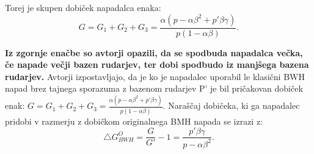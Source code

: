 \documentclass{acm_proc_article-sp}
\begin{document}
Torej je skupen dobiček napadalca enaka:
\newline
\begin{equation} \label{eq:2}
G = G_1 + G_2 + G_3 = \frac{\alpha(p-\alpha\beta^2 + p'\beta\gamma)}{p(1 - \alpha\beta)}.
\end{equation}

\textbf{Iz zgornje enačbe so avtorji opazili, da se spodbuda napadalca večka, če napade večji bazen rudarjev, ter dobi spodbudo iz manjšega bazena rudarjev.}
\newline
Avtorji izpostavljajo, da je ko je napadalec uporabil le klasični BWH napad brez tajnega sporazuma z bazenom rudarjev P' je bil pričakovan dobiček enak: $ G = G_1 + G_2 + G_3 = \frac{\alpha(p-\alpha\beta^2 + p'\beta\gamma)}{p(1 - \alpha\beta)}. $ Naraščaj dobičeka, ki ga napadalec pridobi v razmerju z dobičkom originalnega BMH napada se izrazi z:
\newline
\begin{equation} \label{eq:3}
\bigtriangleup G_{BWH}^O = \frac{G}{G'} - 1 = \frac{p'\beta\gamma}{p - \alpha\beta^2}.
\end{equation}
\end{document}
